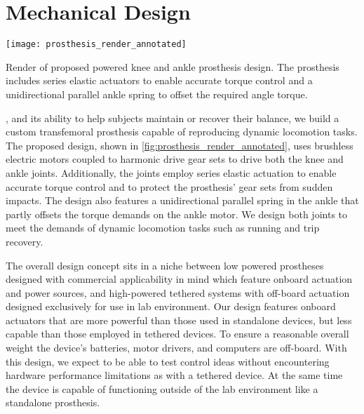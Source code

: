 \section{Mechanical Design}\label{sec:pros_mech_design}
\begin{marginfigure}[1.25in]
    \centering
    \texttt{[image: prosthesis\_render\_annotated]}
    \caption{Render of proposed powered knee and ankle prosthesis design. The
    prosthesis includes series elastic actuators to enable accurate torque
    control and a unidirectional parallel ankle spring to offset the required
    angle torque.}\label{fig:prosthesis_render_annotated}
\end{marginfigure}

, and its
ability to help subjects maintain or recover their balance, we build a custom
transfemoral prosthesis capable of reproducing dynamic locomotion tasks. The
proposed design, shown in \cref{fig:prosthesis_render_annotated}, uses brushless
electric motors coupled to harmonic drive gear sets to drive both the knee and
ankle joints.  Additionally, the joints employ series elastic actuation to
enable accurate torque control and to protect the prosthesis' gear sets from
sudden impacts.  The design also features a unidirectional parallel spring in
the ankle that partly offsets the torque demands on the ankle motor.  We design
both joints to meet the demands of dynamic locomotion tasks such as running and
trip recovery.

The overall design concept sits in a niche between low powered prostheses
designed with commercial applicability in mind
\citep{sup2007design,sup2009preliminary,lawson2014robotic,rouse2015design,
martinez2011antagonistic} which feature onboard actuation and power sources, and
high-powered tethered systems \citep{caputo2013experimental,
caputo2015informing} with off-board actuation designed exclusively for use in
lab environment. Our design features onboard actuators that are more powerful
than those used in standalone devices, but less capable than those employed in
tethered devices. To ensure a reasonable overall weight the device's batteries,
motor drivers, and computers are off-board. With this design, we expect to be
able to test control ideas without encountering hardware performance limitations
as with a tethered device. At the same time the device is capable of functioning
outside of the lab environment like a standalone prosthesis.

